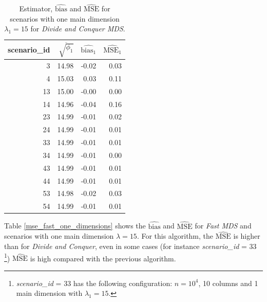 \documentclass[11pt]{report}
\begin{document}
\begin{table}[ht]
\centering
\begin{tabular}{rrrr}
 scenario\_id & $\overline{\sqrt{\phi_1}}$ & $\widehat{\mbox{bias}_1}$ & $\widehat{\mbox{MSE}_1}$ \\ 
  \hline
  3 & 14.98 & -0.02 & 0.03 \\ 
  4 & 15.03 & 0.03 & 0.11 \\ 
  13 & 15.00 & -0.00 & 0.00 \\ 
  14 & 14.96 & -0.04 & 0.16 \\ 
  23 & 14.99 & -0.01 & 0.02 \\ 
  24 & 14.99 & -0.01 & 0.01 \\ 
  33 & 14.99 & -0.01 & 0.01 \\ 
  34 & 14.99 & -0.01 & 0.00 \\ 
  43 & 14.99 & -0.01 & 0.01 \\ 
  44 & 14.99 & -0.01 & 0.01 \\ 
  53 & 14.98 & -0.02 & 0.03 \\ 
  54 & 14.99 & -0.01 & 0.01 \\ 
   \hline
\end{tabular}
\caption{Estimator, $\widehat{\mbox{bias}}$ and $\widehat{\mbox{MSE}}$ for scenarios with one main dimension $\lambda_1 = 15$ for \textit{Divide and Conquer MDS}.}
\label{mse_divide_one_dimensions}
\end{table}

\indent Table \ref{mse_fast_one_dimensions} shows the $\widehat{\mbox{bias}}$ 
and $\widehat{\mbox{MSE}}$ for \textit{Fast MDS} and scenarios with one main 
dimension $\lambda = 15$. For this algorithm, the $\widehat{\mbox{MSE}}$ is
higher than for \textit{Divide and Conquer}, even in some cases 
(for instance \textit{scenario\_id}  = 33 \footnote{\textit{scenario\_id} = 33 
has the following configuration: $n=10^4$, 10 columns and 1 main dimension 
with $\lambda_1 = 15$.})
$\widehat{\mbox{MSE}}$ is high compared with the previous algorithm. 
\end{document}
